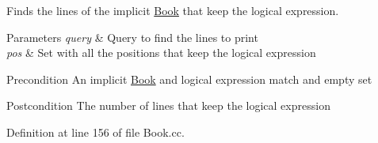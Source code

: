 Finds the lines of the implicit \hyperlink{class_book}{Book} that keep the logical expression. 


\begin{DoxyParams}{Parameters}
{\em query} & Query to find the lines to print \\
\hline
{\em pos} & Set with all the positions that keep the logical expression \\
\hline
\end{DoxyParams}
\begin{DoxyPrecond}{Precondition}
An implicit \hyperlink{class_book}{Book} and logical expression match and empty set 
\end{DoxyPrecond}
\begin{DoxyPostcond}{Postcondition}
The number of lines that keep the logical expression 
\end{DoxyPostcond}


Definition at line 156 of file Book.\+cc.


